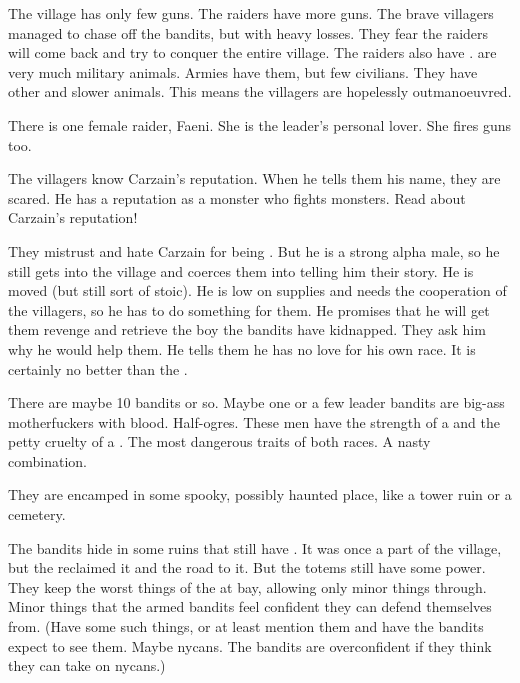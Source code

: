 The village has only few guns.
The raiders have more guns.
The brave villagers managed to chase off the bandits, but with heavy losses.
They fear the raiders will come back and try to conquer the entire village.
The raiders also have \relcs.
\Relcs are very much military animals.
Armies have them, but few civilians. 
They have other and slower animals.
This means the villagers are hopelessly outmanoeuvred.

There is one female raider, Faeni.
She is the leader's personal lover.
She fires guns too.

The villagers know Carzain's reputation.
When he tells them his name, they are scared. 
He has a reputation as a monster who fights monsters. 
Read about Carzain's reputation! 

They mistrust and hate Carzain for being \human.
But he is a strong alpha male, so he still gets into the village and coerces them into telling him their story.
He is moved (but still sort of stoic).
He is low on supplies and needs the cooperation of the villagers, so he has to do something for them.
He promises that he will get them revenge and retrieve the boy the bandits have kidnapped.
They ask him why he would help them.
He tells them he has no love for his own race.
It is certainly no better than the \scathae.



\begin{comment}
  \section{The bandits}
\end{comment}

There are maybe 10 bandits or so. 
Maybe one or a few leader bandits are big-ass motherfuckers with \nephil blood.
Half-ogres.
These men have the strength of a \nephil and the petty cruelty of a \human.
The most dangerous traits of both races.
A nasty combination.

They are encamped in some spooky, possibly haunted place, like a tower ruin or a cemetery.

The bandits hide in some ruins that still have \wylde \eidola.
It was once a part of the village, but the \wylde reclaimed it and the road to it.
But the totems still have some power.
They keep the worst things of the \wylde at bay, allowing only minor things through.
Minor things that the armed bandits feel confident they can defend themselves from.
(Have some such things, or at least mention them and have the bandits expect to see them. Maybe nycans. 
The bandits are overconfident if they think they can take on nycans.)

